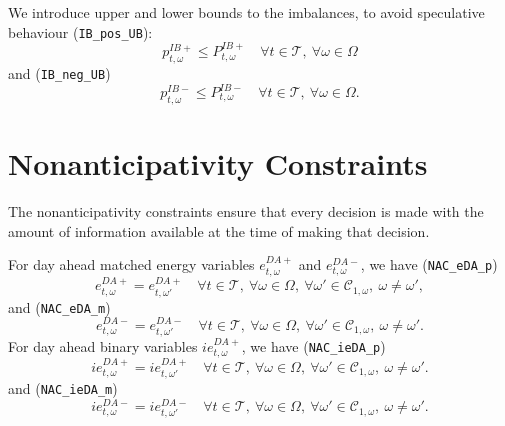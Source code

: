 \documentclass{article}
\begin{document}
We introduce upper and lower bounds to the imbalances, to avoid speculative behaviour (\verb|IB_pos_UB|):
\begin{equation} \label{EQ:VPP_IB_MAX}
	p_{t, \omega}^{IB+} \leq P_{t, \omega}^{IB+} \quad \forall t \in \mathcal{T}, \ \forall \omega \in \Omega
\end{equation}
and (\verb|IB_neg_UB|)
\begin{equation} \label{EQ:VPP_IB_MIN}
	p_{t, \omega}^{IB-} \leq P_{t, \omega}^{IB-} \quad \forall t \in \mathcal{T}, \ \forall \omega \in \Omega.
\end{equation}



\section{Nonanticipativity Constraints}
\label{SEC:NonanticipativityConstraints}

The nonanticipativity constraints ensure that every decision is made with the amount of information available at the time of making that decision.

For day ahead matched energy variables $e^{DA+}_{t, \omega}$ and $e^{DA-}_{t, \omega}$, we have (\verb|NAC_eDA_p|)
\begin{equation} \label{EQ:NAC_eDA_p}
	e^{DA+}_{t, \omega} = e^{DA+}_{t, \omega'} \quad \forall t \in \mathcal{T}, \ \forall \omega \in \Omega, \ \forall \omega' \in \mathcal{C}_{1, \omega}, \ \omega \neq \omega',
\end{equation}
and (\verb|NAC_eDA_m|)
\begin{equation} \label{EQ:NAC_eDA_m}
	e^{DA-}_{t, \omega} = e^{DA-}_{t, \omega'} \quad \forall t \in \mathcal{T}, \ \forall \omega \in \Omega, \ \forall \omega' \in \mathcal{C}_{1, \omega} , \ \omega \neq \omega'.
\end{equation}
For day ahead binary variables $ie^{DA+}_{t, \omega}$, we have (\verb|NAC_ieDA_p|)
\begin{equation} \label{EQ:NAC_ieDA_p}
	ie^{DA+}_{t, \omega} = ie^{DA+}_{t, \omega'} \quad \forall t \in \mathcal{T}, \ \forall \omega \in \Omega, \ \forall \omega' \in \mathcal{C}_{1, \omega} , \ \omega \neq \omega'.
\end{equation}
and (\verb|NAC_ieDA_m|)
\begin{equation} \label{EQ:NAC_ieDA_m}
	ie^{DA-}_{t, \omega} = ie^{DA-}_{t, \omega'} \quad \forall t \in \mathcal{T}, \ \forall \omega \in \Omega, \ \forall \omega' \in \mathcal{C}_{1, \omega} , \ \omega \neq \omega'.
\end{equation}
\end{document}
